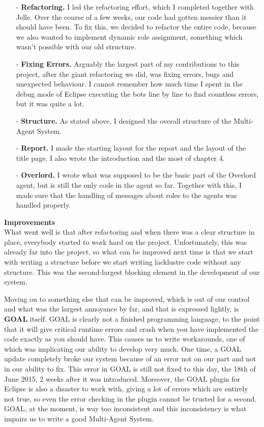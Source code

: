 \begin{itemize}
\item[-] \textbf{Refactoring.} I led the refactoring effort, which I completed together with Jelle. Over the course of a few weeks, our code had gotten messier than it should have been. To fix this, we decided to refactor the entire code, because we also wanted to implement dynamic role assignment, something which wasn't possible with our old structure.
\item[-] \textbf{Fixing Errors.} Arguably the largest part of my contributions to this project, after the giant refactoring we did, was fixing errors, bugs and unexpected behaviour. I cannot remember how much time I spent in the debug mode of Eclipse executing the bots line by line to find countless errors, but it was quite a lot.
\item[-] \textbf{Structure.} As stated above, I designed the overall structure of the Multi-Agent System.
\item[-] \textbf{Report.} I made the starting layout for the report and the layout of the title page. I also wrote the introduction and the most of chapter 4.
\item[-] \textbf{Overlord.} I wrote what was supposed to be the basic part of the Overlord agent, but is still the only code in the agent so far. Together with this, I made sure that the handling of messages about roles to the agents was handled properly.
\end{itemize}
\noindent
\textbf{Improvements}\\
What went well is that after refactoring and when there was a clear structure in place, everybody started to work hard on the project. Unfortunately, this was already far into the project, so what can be improved next time is that we start with writing a structure before we start writing lacklustre code without any structure. This was the second-largest blocking element in the development of our system.

Moving on to something else that can be improved, which is out of our control and what was the largest annoyance by far, and that is expressed lightly, is \textbf{GOAL} itself. GOAL is clearly not a finished programming language, to the point that it will give critical runtime errors and crash when you have implemented the code exactly as you should have. This causes us to write workarounds, one of which was implicating our ability to develop very much. One time, a GOAL update completely broke our system because of an error not on our part and not in our ability to fix. This error in GOAL is still not fixed to this day, the 18th of June 2015, 2 weeks after it was introduced. Moreover, the GOAL plugin for Eclipse is also a disaster to work with, giving a lot of errors which are entirely not true, so even the error checking in the plugin cannot be trusted for a second. GOAL, at the moment, is way too inconsistent and this inconsistency is what impairs us to write a good Multi-Agent System.

